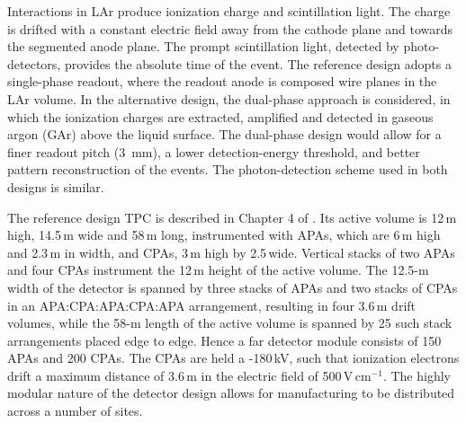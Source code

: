 Interactions in LAr produce ionization charge and scintillation light.
The charge is drifted with a constant electric field away from the cathode
plane and towards the segmented anode plane. 
The prompt scintillation light,
detected by photo-detectors, provides the absolute time of the event.
The reference design adopts a single-phase readout, where the readout anode is composed wire planes in the LAr volume. 
In the alternative design, the  dual-phase approach is considered, in which the 
ionization charges are extracted, amplified and detected in gaseous argon (GAr) above the liquid surface. 
The dual-phase design would allow for a finer readout pitch (3~mm), 
a lower detection-energy threshold, and better pattern reconstruction of the events.
The photon-detection scheme used in both designs is similar. 

The  reference design TPC is described in Chapter 4 of \voldune. 
Its active volume is 12\,m high, 14.5\,m wide and 
58\,m long, instrumented with APAs, 
which are 6\,m high and 2.3\,m in width, and CPAs, 3\,m high by 2.5\,wide. Vertical stacks of
two APAs and four CPAs %
instrument 
the 12\,m height of the active volume. The 12.5-m width of the detector is 
spanned by three stacks of APAs and two stacks of CPAs in an APA:CPA:APA:CPA:APA
arrangement, resulting in four 3.6\,m drift volumes, while the 58-m length of the active volume
is spanned by 25 such stack arrangements placed edge to edge. Hence a  
far detector module consists of 150 APAs and 200 CPAs. The CPAs are held a -180\,kV, such that 
ionization electrons drift a maximum distance of 3.6\,m in the electric field of 500\,V\,cm$^{-1}$.
The highly modular nature of the detector design allows for manufacturing to be distributed across a number of sites.


